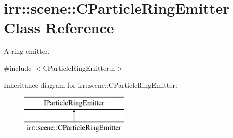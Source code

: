 \hypertarget{classirr_1_1scene_1_1_c_particle_ring_emitter}{\section{irr\-:\-:scene\-:\-:C\-Particle\-Ring\-Emitter Class Reference}
\label{classirr_1_1scene_1_1_c_particle_ring_emitter}
}


A ring emitter.  




{\ttfamily \#include $<$C\-Particle\-Ring\-Emitter.\-h$>$}

Inheritance diagram for irr\-:\-:scene\-:\-:C\-Particle\-Ring\-Emitter\-:\begin{figure}[H]
\begin{center}
\leavevmode
\includegraphics[height=2.000000cm]{classirr_1_1scene_1_1_c_particle_ring_emitter}
\end{center}
\end{figure}
